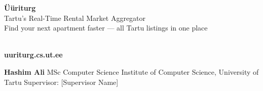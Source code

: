 \documentclass[12pt]{article}
\renewcommand{\large}{\fontsize{32}{40}\selectfont}
\renewcommand{\LARGE}{\fontsize{52}{62}\selectfont}
\renewcommand{\Huge}{\fontsize{90}{108}\selectfont}
\begin{document}
\begin{tcolorbox}[
  colback=primary, colframe=primary,
  arc=0pt, boxrule=0pt,
  left=20pt, right=20pt, top=20pt, bottom=20pt
]
  \begin{minipage}[c]{0.75\textwidth}
    {\Huge\bfseries\color{white} Üüriturg}\\[6pt]
    {\LARGE\color{white} Tartu's Real-Time Rental Market Aggregator}\\[8pt]
    {\large\color{white!80!primary} Find your next apartment faster — all Tartu listings in one place}
  \end{minipage}
  \hfill
  \begin{minipage}[c]{0.18\textwidth}
    \centering
    \color{white}
    \\[4pt]
    {\large\bfseries uuriturg.cs.ut.ee}
  \end{minipage}
\end{tcolorbox}

\begin{tcolorbox}[
  colback=primarydark, colframe=primarydark,
  arc=0pt, boxrule=0pt,
  left=20pt, right=20pt, top=8pt, bottom=8pt
]
  \centering\color{white}\large
  \textbf{Hashim Ali} \quad\textbullet\quad
  MSc Computer Science \quad\textbullet\quad
  Institute of Computer Science, University of Tartu \quad\textbullet\quad
  Supervisor: [Supervisor Name]
\end{tcolorbox}

\vspace{0.4cm}
\end{document}
